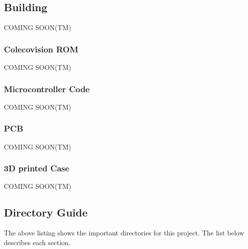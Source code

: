 \documentclass{article}
\begin{document}
  \subsection{Building}

  \par
  COMING SOON(TM)

  \subsubsection{Colecovision ROM}

  \par
  COMING SOON(TM)

  \subsubsection{Microcontroller Code}

  \par
  COMING SOON(TM)

  \subsubsection{PCB}

  \par
  COMING SOON(TM)

  \subsubsection{3D printed Case}

  \par
  COMING SOON(TM)

  \subsection{Directory Guide}


  \vspace{\baselineskip}

  \par
  The above listing shows the important directories for this project. The list below describes each section.
\end{document}

